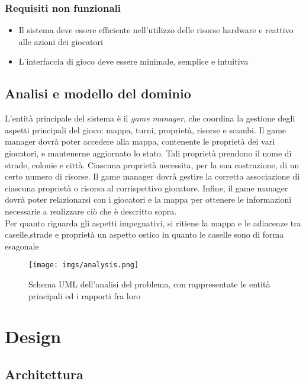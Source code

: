 \documentclass[a4paper,12pt]{report}
\begin{document}
\subsection{Requisiti non funzionali}
\begin{itemize}
    \item Il sistema deve essere efficiente nell'utilizzo delle risorse hardware e reattivo alle azioni dei giocatori
    \item L'interfaccia di gioco deve essere minimale, semplice e intuitiva
\end{itemize}

\section{Analisi e modello del dominio}

L'entità principale del sistema è il \textit{game manager}, che coordina la gestione degli aspetti principali del gioco: mappa, turni, proprietà, risorse e scambi. Il game manager dovrà poter accedere alla mappa, contenente le proprietà dei vari giocatori, e mantenerne aggiornato lo stato. Tali proprietà prendono il nome di strade, colonie e città. Ciascuna proprietà necessita, per la sua costruzione, di un certo numero di risorse. Il game manager dovrà gestire la corretta associazione di ciascuna proprietà o risorsa al corrispettivo giocatore. Infine, il game manager dovrà poter relazionarsi con i giocatori e la mappa per ottenere le informazioni necessarie a realizzare ciò che è descritto sopra.\\
Per quanto riguarda gli aspetti impegnativi, si ritiene la mappa e le adiacenze tra caselle,strade e proprietà un aspetto ostico in quanto le caselle sono di forma esagonale

\begin{figure}[H]
\centering{}
\texttt{[image: imgs/analysis.png]}
\caption{Schema UML dell'analisi del problema, con rappresentate le entità principali ed i rapporti fra loro}
\label{img:analysis}
\end{figure}

\chapter{Design}

\section{Architettura}
\end{document}
